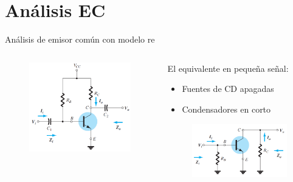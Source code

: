 \documentclass[t,aspectratio=169]{beamer}
\begin{document}
\section{Análisis EC}
\begin{frame}{Análisis de emisor común con modelo re}

\begin{columns}
\begin{column}{0.5\textwidth}
\begin{figure}[H]
    \centering
    \includegraphics[width=\textwidth]{figuras/analisis_re_ec_1.png}
\end{figure}
\end{column}
\begin{column}{0.5\textwidth}
El equivalente en pequeña señal: 
\begin{itemize}
    \item Fuentes de CD apagadas
    \item Condensadores en corto
\end{itemize}

\begin{figure}[H]
    \centering
    \includegraphics[width=\textwidth]{figuras/analisis_re_ec_2.png}
\end{figure}
\end{column}
\end{columns}

\end{frame}
\end{document}
